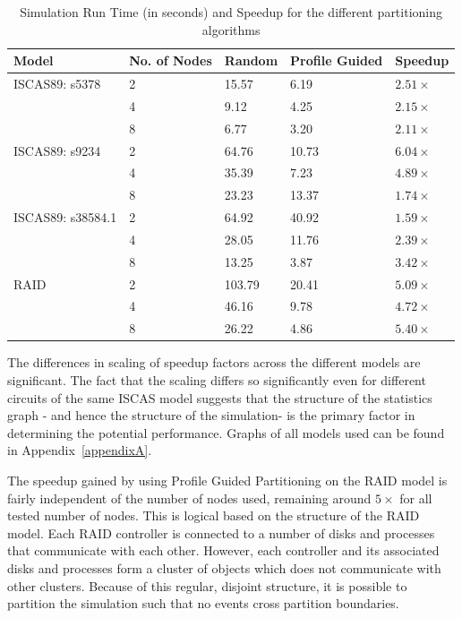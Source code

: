 \documentclass[11pt]{book}
\begin{document}
\begin{table}[h]\label{tab:benchmarks}
\centering
\begin{tabular}{@{}lllll@{}}
\toprule
Model             & No. of Nodes & Random & Profile Guided & Speedup           \\ \midrule
ISCAS89: s5378    & 2            & 15.57  & 6.19           & \(2.51\times\)    \\
                  & 4            & 9.12   & 4.25           & \(2.15\times\)    \\
                  & 8            & 6.77   & 3.20           & \(2.11\times\)    \\ \midrule
ISCAS89: s9234    & 2            & 64.76  & 10.73          & \(6.04\times\)    \\
                  & 4            & 35.39  & 7.23           & \(4.89\times\)    \\
                  & 8            & 23.23  & 13.37          & \(1.74\times\)    \\ \midrule
ISCAS89: s38584.1 & 2            & 64.92  & 40.92          & \(1.59\times\)    \\
                  & 4            & 28.05  & 11.76          & \(2.39\times\)    \\
                  & 8            & 13.25  & 3.87           & \(3.42\times\)    \\ \midrule
RAID              & 2            & 103.79 & 20.41          & \(5.09\times\)    \\
                  & 4            & 46.16  & 9.78           & \(4.72\times\)    \\
                  & 8            & 26.22  & 4.86           & \(5.40\times\)    \\ \bottomrule
\end{tabular}
\caption{Simulation Run Time (in seconds) and Speedup for the different partitioning algorithms}
\end{table}

The differences in scaling of speedup factors across the different models are significant. The fact that the scaling differs so significantly even for different circuits of the same ISCAS model suggests that the structure of the statistics graph \-- and hence the structure of the simulation\-- is the primary factor in determining the potential performance. Graphs of all models used can be found in Appendix~\ref{appendixA}. 

The speedup gained by using Profile Guided Partitioning on the RAID model is fairly independent of the number of nodes used, remaining around \(5\times\) for all tested number of nodes. This is logical based on the structure of the RAID model. Each RAID controller is connected to a number of disks and processes that communicate with each other. However, each controller and its associated disks and processes form a cluster of objects which does not communicate with other clusters. Because of this regular, disjoint structure, it is possible to partition the simulation such that no events cross partition boundaries.
\end{document}
